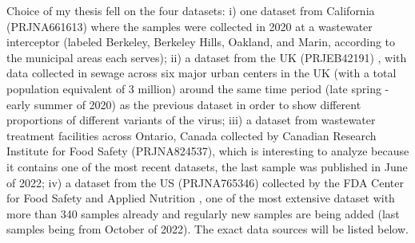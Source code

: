             Choice of my thesis fell on the four datasets: i) one dataset from California (PRJNA661613)\cite{critschristoph} where the samples were collected in 2020 at a wastewater interceptor (labeled Berkeley, Berkeley Hills, Oakland, and Marin, according to the municipal areas each serves); ii) a dataset from the UK (PRJEB42191) \cite{hillary2021}, with data collected in sewage across six major urban centers in the UK (with a total population equivalent of 3 million) around the same time period (late spring - early summer of 2020) as the previous dataset  in order to show different proportions of different variants of the virus; iii) a dataset from wastewater treatment facilities across Ontario, Canada collected by Canadian Research Institute for Food Safety (PRJNA824537), which is interesting to analyze because it contains  one of the most recent datasets, the last sample was published in June of 2022; iv) a dataset from the US (PRJNA765346) collected by the FDA Center for Food Safety and Applied Nutrition \cite{nutrition2022}, one of the most extensive dataset with more than 340 samples already and regularly new samples are being added (last samples being from October of 2022). The exact data sources will be listed below.
            
